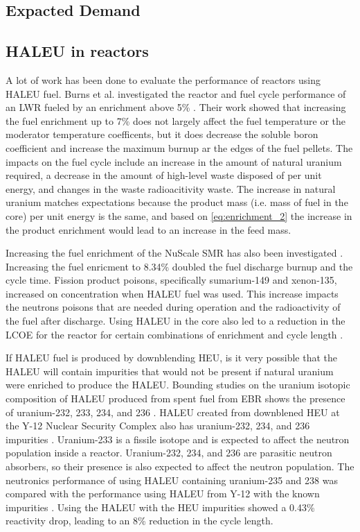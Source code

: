 \subsection{Expacted Demand}

\subsection{HALEU in reactors}
A lot of work has been done to evaluate the performance of reactors 
using \gls{HALEU} fuel. Burns et al. investigated the reactor and fuel cycle 
performance of an \gls{LWR} fueled by an enrichment above 5\% \cite{burns_reactor_2020}.
Their work showed that increasing the fuel enrichment up to 7\% does not 
largely affect the fuel temperature or the moderator temperature coefficents,
but it does decrease the soluble boron coefficient and increase the maximum 
burnup ar the edges of the fuel pellets. The impacts on the fuel cycle include 
an increase in the amount of natural uranium required, a decrease in the 
amount of high-level waste disposed of per unit energy, and changes in the 
waste radioacitivity waste. The increase in natural uranium matches 
expectations
because the product mass (i.e. mass of fuel in the core) per unit 
energy is the same, and 
based on \ref{eq:enrichment_2} the increase in the product enrichment would 
lead to an increase in the feed mass. 

Increasing the fuel enrichment of the NuScale \gls{SMR} has also been investigated 
\cite{carlson_implications_2022}. Increasing the fuel enricment to 8.34\% doubled the 
fuel discharge burnup and the cycle time. Fission product poisons, specifically 
sumarium-149 and xenon-135, increased on concentration when \gls{HALEU} fuel was used. 
This increase impacts the neutrons poisons that are needed during operation and the 
radioactivity of the fuel after discharge. Using \gls{HALEU} in the core also led 
to a reduction in the \gls{LCOE} for the reactor for certain combinations of 
enrichment and cycle length \cite{carlson_economic_2020,carlson_implications_2022}.

If \gls{HALEU} fuel is produced by downblending \gls{HEU}, is it very possible that 
the \gls{HALEU} will contain impurities that would not be present if natural uranium 
were enriched to produce the \gls{HALEU}. Bounding studies on the uranium isotopic 
composition of \gls{HALEU} produced from spent fuel from \gls{EBR} shows the presence 
of uranium-232, 233, 234, and 236 \cite{vaden_isotopic_2018}. \gls{HALEU} created from 
downblened \gls{HEU} at the Y-12 Nuclear Security Complex also has uranium-232, 234, and 
236 impurities \cite{nelson_foreign_2010}. Uranium-233 is a fissile 
isotope and is expected to affect the neutron population inside a reactor. Uranium-232, 
234, and 236 are parasitic neutron absorbers, so their presence is also expected to affect 
the neutron population. The neutronics performance of using \gls{HALEU} containing
uranium-235 and 238 was compared with the performance using \gls{HALEU} from Y-12 with the 
known impurities \cite{celikten_effects_2021}. Using 
the \gls{HALEU} with the \gls{HEU} impurities showed a 0.43\% reactivity drop, leading to 
an 8\% reduction in the cycle length. 
